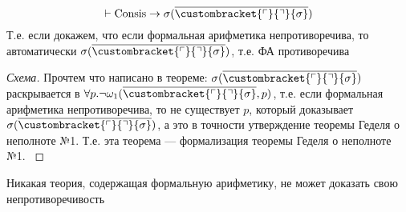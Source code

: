 \documentclass[english]{article}
\newcommand{\gedel}[1]{\custombracket{\ulcorner}{\urcorner}{#1}}
\begin{document}
\begin{theorem}
	\[ \vdash {\rm Consis} \to \sigma(\overline{\gedel{\sigma}}) \]
	Т.е. если докажем, что если формальная арифметика непротиворечива, то автоматически \(\sigma(\overline{\gedel{\sigma}})\), т.е. ФА противоречива
	\label{orgdd8e44b}
\end{theorem}
\begin{proof}[Схема]
	Прочтем что написано в теореме: \(\sigma(\overline{\gedel{\sigma}})\) раскрывается в \(\forall p. \neg \omega_1(\overline{\gedel{\sigma}}, p)\), т.е. если формальная арифметика непротиворечива, то не существует \(p\), который доказывает \(\sigma(\overline{\gedel{\sigma}})\), а это в точности утверждение теоремы Геделя о неполноте №1. Т.е. эта теорема --- формализация теоремы Геделя о неполноте №1.
	\label{org5dff23a}
\end{proof}
\begin{corollary}
	Никакая теория, содержащая формальную арифметику, не может доказать свою непротиворечивость
	\label{org573ded7}
\end{corollary}
\end{document}
